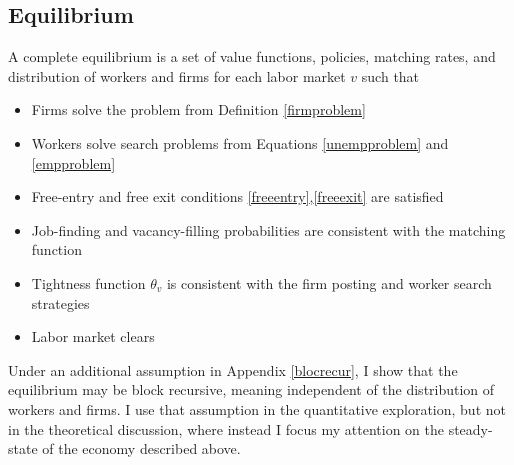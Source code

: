 \subsection{Equilibrium}
A complete equilibrium is a set of value functions, policies, matching rates, and distribution of workers and firms for each labor market $v$ such that 
\begin{itemize}
    \item Firms solve the problem from Definition \ref{firmproblem}
    \item Workers solve search problems from Equations \ref{unempproblem} and \ref{empproblem}
    \item Free-entry  and free exit conditions \ref{freeentry},\ref{freeexit}  are satisfied
    \item Job-finding and vacancy-filling probabilities are consistent with the matching function
    \item Tightness function $\theta_v$ is consistent with the firm posting and worker search strategies
    \item Labor market clears
\end{itemize}
Under an additional assumption in Appendix \ref{blocrecur}, I show that the equilibrium may be block recursive, meaning independent of the distribution of workers and firms. I use that assumption in the quantitative exploration, but not in the theoretical discussion, where instead I focus my attention on the steady-state of the economy described above.

